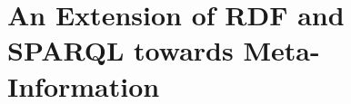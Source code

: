 \chapter{An Extension of RDF and SPARQL towards Meta-Information}
\label{cha:anql}




















